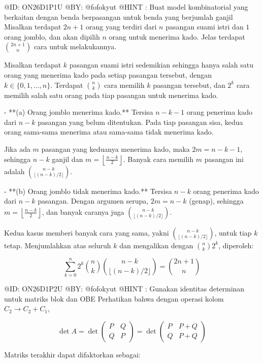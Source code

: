@ID: ON26D1P1U
@BY: @fofokyut
@HINT : Buat model kombinatorial yang berkaitan dengan benda berpasangan untuk benda yang berjumlah ganjil
Misalkan terdapat $2n+1$ orang yang terdiri dari $n$ pasangan suami istri dan $1$ orang jomblo, dan akan dipilih $n$ orang untuk menerima kado. Jelas terdapat $\binom{2n+1}{n}$ cara untuk melakukannya.

Misalkan terdapat $k$ pasangan suami istri sedemikian sehingga hanya salah satu orang yang menerima kado pada setiap pasangan tersebut, dengan $k \in \{0,1,\dots,n\}$. Terdapat $\binom{n}{k}$ cara memilih $k$ pasangan tersebut, dan $2^k$ cara memilih salah satu orang pada tiap pasangan untuk menerima kado.

- **(a) Orang jomblo menerima kado.** Tersisa $n-k-1$ orang penerima kado dari $n-k$ pasangan yang belum ditentukan. Pada tiap pasangan sisa, kedua orang sama-sama menerima atau sama-sama tidak menerima kado. 
    
    Jika ada $m$ pasangan yang keduanya menerima kado, maka $2m = n-k-1$, sehingga $n-k$ ganjil dan $m = \left\lfloor \frac{n-k}{2} \right\rfloor$. Banyak cara memilih $m$ pasangan ini adalah $\binom{n-k}{\lfloor (n-k)/2 \rfloor}$.

- **(b) Orang jomblo tidak menerima kado.** Tersisa $n-k$ orang penerima kado dari $n-k$ pasangan. Dengan argumen serupa, $2m = n-k$ (genap), sehingga $m = \left\lfloor \frac{n-k}{2} \right\rfloor$, dan banyak caranya juga $\binom{n-k}{\lfloor (n-k)/2 \rfloor}$.

Kedua kasus memberi banyak cara yang sama, yakni $\binom{n-k}{\lfloor (n-k)/2\rfloor}$, untuk tiap $k$ tetap. Menjumlahkan atas seluruh $k$ dan mengalikan dengan $\binom{n}{k}2^k$, diperoleh:


$$ 
\sum_{k=0}^{n} 2^k \binom{n}{k}\binom{n-k}{\lfloor (n-k)/2\rfloor} = \binom{2n+1}{n} 
$$




@ID: ON26D1P2U
@BY: @fofokyut
@HINT : Gunakan identitas determinan untuk matriks blok dan OBE
Perhatikan bahwa dengan operasi kolom $C_2 \to C_2 + C_1$,

$$
\det A = \det\begin{pmatrix} P & Q \\ Q & P \end{pmatrix} = \det\begin{pmatrix} P & P+Q \\ Q & P+Q \end{pmatrix}
$$

Matriks terakhir dapat difaktorkan sebagai:

